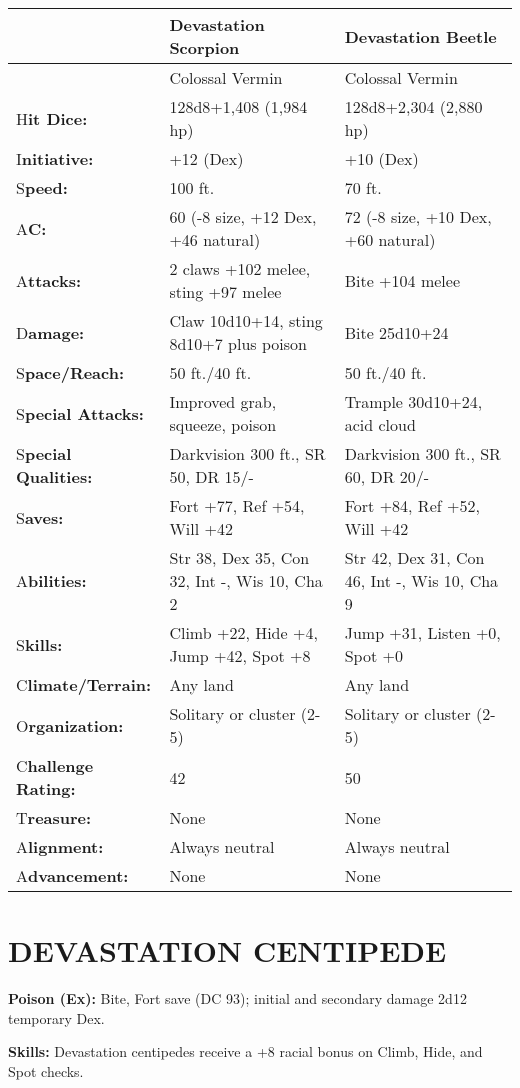 \documentclass{article}
\begin{document}
\vspace{12pt}
\begin{tabular}{|>{\raggedright}p{59pt}|>{\raggedright}p{127pt}|>{\raggedright}p{127pt}|}
\hline
  & D\textbf{evastation Scorpion } & D\textbf{evastation Beetle }\tabularnewline
\hline
 & Colossal Vermin  & Colossal Vermin \tabularnewline
\hline
H\textbf{it Dice:}  & 128d8+1,408 (1,984 hp)  & 128d8+2,304 (2,880 hp) \tabularnewline
\hline
I\textbf{nitiative:}  & +12 (Dex)  & +10 (Dex) \tabularnewline
\hline
S\textbf{peed:}  & 100 ft.  & 70 ft. \tabularnewline
\hline
A\textbf{C:}  & 60 (-8 size, +12 Dex, +46 natural)  & 72 (-8 size, +10 Dex, +60 
natural) \tabularnewline
\hline
A\textbf{ttacks:}  & 2 claws +102 melee, sting +97 melee  & Bite +104 melee \tabularnewline
\hline
D\textbf{amage:}  & Claw 10d10+14, sting 8d10+7 plus poison  & Bite 25d10+24 \tabularnewline
\hline
S\textbf{pace/Reach:}  & 50 ft./40 ft.  & 50 ft./40 ft. \tabularnewline
\hline
S\textbf{pecial Attacks:}  & Improved grab, squeeze, poison  & Trample 30d10+24, 
acid cloud \tabularnewline
\hline
S\textbf{pecial Qualities:}  & Darkvision 300 ft., SR 50, DR 15/-   & Darkvision 
300 ft., SR 60, DR 20/-  \tabularnewline
\hline
S\textbf{aves:}  & Fort +77, Ref +54, Will +42  & Fort +84, Ref +52, Will +42 \tabularnewline
\hline
A\textbf{bilities:}  & Str 38, Dex 35, Con 32, Int -, Wis 10, Cha 2  & Str 42, 
Dex 31, Con 46, Int -, Wis 10, Cha 9 \tabularnewline
\hline
S\textbf{kills:}  & Climb +22, Hide +4, Jump +42, Spot +8 & Jump +31, Listen +0, 
Spot +0\tabularnewline
\hline
C\textbf{limate/Terrain:}  & Any land  & Any land \tabularnewline
\hline
O\textbf{rganization:}  & Solitary or cluster (2-5)  & Solitary or cluster (2-5) 
\tabularnewline
\hline
C\textbf{hallenge Rating:}  & 42  & 50 \tabularnewline
\hline
T\textbf{reasure:}  & None  & None \tabularnewline
\hline
A\textbf{lignment:}  & Always neutral  & Always neutral \tabularnewline
\hline
A\textbf{dvancement:}  & None  & None\tabularnewline
\hline
\end{tabular}

\section*{DEVASTATION CENTIPEDE }

\textbf{Poison (Ex): }Bite, Fort save (DC 93); initial and secondary damage 2d12 
temporary Dex. 

\textbf{Skills:} Devastation centipedes receive a +8 racial bonus on Climb, Hide, 
and Spot checks. 
\end{document}
